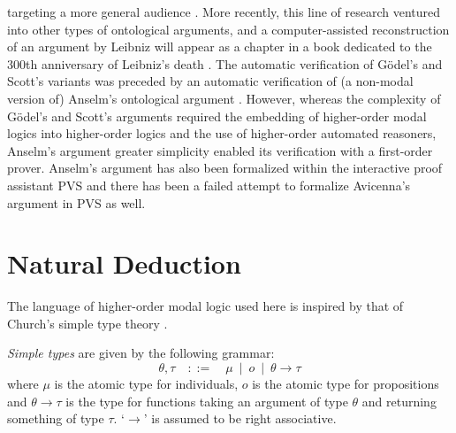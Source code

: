 \documentclass[smallextended]{svjour3}
\newcommand{\imp}{\rightarrow}
\begin{document}
targeting a more general audience \citep{AustrianComputerSociety}.
More recently, this line of research ventured into other types of
ontological arguments, and a computer-assisted reconstruction of an
argument by Leibniz will appear as a chapter in a book dedicated to
the 300th anniversary of Leibniz's death
\citep{LeibnizOntologicalProof}. The automatic verification of G\"odel's
and Scott's variants \citep{ECAI2014} was preceded by an automatic
verification of (a non-modal version of) Anselm's ontological argument
\citep{ZaltaOppenheimer}. However, whereas the complexity of G\"odel's
and Scott's arguments required the embedding of higher-order modal
logics into higher-order logics and the use of higher-order automated
reasoners, Anselm's argument greater simplicity enabled its
verification with a first-order prover. Anselm's argument has also been
formalized within the interactive proof assistant PVS \citep{Rushby}
and there has been a failed attempt to formalize Avicenna's
argument in PVS as well.





\section{Natural Deduction}
\label{sec:calculus}

The language of higher-order modal logic used here is inspired by that of Church's simple type theory \citep{church}.

\begin{definition} \emph{Simple types} are given by the following grammar:
$$
  \theta,\tau \quad ::= \quad \mu \ \mid \ o \ \mid \ \theta \imp \tau
$$
where $\mu$ is the atomic type for individuals, $o$ is the atomic type for propositions and $\theta \imp \tau$ is the type for functions taking an argument of type $\theta$ and returning something of type $\tau$. `$\imp$' is assumed to be right associative.
\end{definition}
\end{document}
